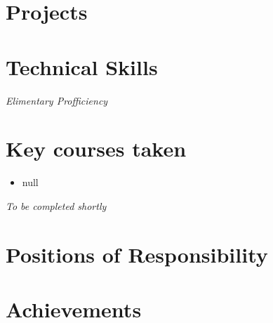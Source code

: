 \documentclass[a4paper,10pt]{report}
\begin{document}
\vspace{4pt}


\section{Projects}
  


\vspace{4pt}


\section{Technical Skills}

 
 \hfill * \textit{Elimentary Profficiency}
 
 
 
 \vspace{1pt}
 
 
 \section{Key courses taken}
\vspace{-2pt}
 \begin{multicols}{2}
 \begin{itemize}[leftmargin = *,itemsep=-3pt]

\item null
 \end{itemize}
 \end{multicols}
 \hfill * \textit{To be completed shortly}
 
 
 \vspace{4pt}


\section{Positions of Responsibility}



\vspace{4pt}


\section{Achievements}
  

\end{document}
